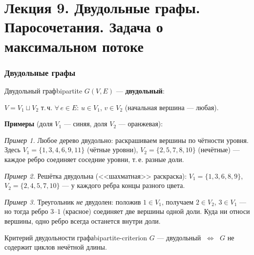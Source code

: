 \chapter{Лекция 9. Двудольные графы. Паросочетания. Задача о максимальном потоке}


\subsection*{Двудольные графы}

\begin{defn}{Двудольный граф}{bipartite}
$G(V, E)$ --- \textbf{двудольный}:

$V = V_1 \sqcup V_2$ т.\,ч. $\forall\, e \in E$: $u \in V_1$, $v \in V_2$
\quad (начальная вершина --- любая).
\end{defn}

\medskip
\noindent\textbf{Примеры} (доля $V_1$ --- синяя, доля $V_2$ --- оранжевая):

\noindent\textit{Пример 1.} Любое дерево двудольно: раскрашиваем вершины
по чётности уровня. Здесь $V_1 = \{1, 3, 4, 6, 9, 11\}$ (чётные уровни),
$V_2 = \{2, 5, 7, 8, 10\}$ (нечётные) --- каждое ребро соединяет
соседние уровни, т.\,е. разные доли.

\noindent\textit{Пример 2.} Решётка двудольна (<<шахматная>> раскраска):
$V_1 = \{1, 3, 6, 8, 9\}$, $V_2 = \{2, 4, 5, 7, 10\}$ --- у каждого
ребра концы разного цвета.

\noindent\textit{Пример 3.} Треугольник \emph{не} двудолен: положив
$1 \in V_1$, получаем $2 \in V_2$, $3 \in V_1$ --- но тогда ребро
$3$--$1$ (красное) соединяет две вершины одной доли. Куда ни относи
вершины, одно ребро всегда останется внутри доли.

\begin{statement}{Критерий двудольности графа}{bipartite-criterion}
$G$ --- двудольный $\;\Leftrightarrow\;$ $G$ не содержит циклов нечётной длины.
\end{statement}

